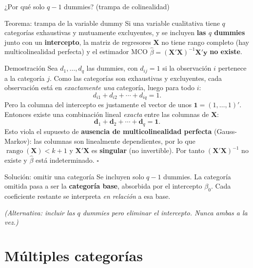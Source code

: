 \documentclass{beamer}
\begin{document}
\begin{frame}[allowframebreaks]{¿Por qué solo $q-1$ dummies? (trampa de colinealidad)}

\begin{alertblock}{Teorema: trampa de la variable dummy}
Si una variable cualitativa tiene $q$ categorías exhaustivas y mutuamente excluyentes, y se incluyen \textbf{las $q$ dummies} junto con un \textbf{intercepto}, la matriz de regresores $\mathbf{X}$ no tiene rango completo (hay multicolinealidad perfecta) y el estimador MCO $\hat{\beta}=(\mathbf{X}'\mathbf{X})^{-1}\mathbf{X}'\mathbf{y}$ \textbf{no existe}.
\end{alertblock}

\framebreak

\begin{exampleblock}{Demostración}
Sea $d_1,\dots,d_q$ las dummies, con $d_{ij}=1$ si la observación $i$ pertenece a la categoría $j$. Como las categorías son exhaustivas y excluyentes, cada observación está en \emph{exactamente una} categoría, luego para todo $i$:
\[
d_{i1} + d_{i2} + \cdots + d_{iq} = 1.
\]
\pause
Pero la columna del intercepto es justamente el vector de unos $\mathbf{1}=(1,\dots,1)'$. Entonces existe una combinación lineal \emph{exacta} entre las columnas de $\mathbf{X}$:
\[
\mathbf{d}_1 + \mathbf{d}_2 + \cdots + \mathbf{d}_q = \mathbf{1}.
\]
\pause
Esto viola el supuesto de \textbf{ausencia de multicolinealidad perfecta} (Gauss-Markov): las columnas son linealmente dependientes, por lo que $\operatorname{rango}(\mathbf{X})<k+1$ y $\mathbf{X}'\mathbf{X}$ es \textbf{singular} (no invertible). Por tanto $(\mathbf{X}'\mathbf{X})^{-1}$ no existe y $\hat{\beta}$ está indeterminado. \hfill$\square$
\end{exampleblock}

\framebreak

\begin{block}{Solución: omitir una categoría}
Se incluyen solo $q-1$ dummies. La categoría omitida pasa a ser la \textbf{categoría base}, absorbida por el intercepto $\beta_0$. Cada coeficiente restante se interpreta \emph{en relación} a esa base.

\medskip
\textit{(Alternativa: incluir las $q$ dummies pero eliminar el intercepto. Nunca ambas a la vez.)}
\end{block}

\end{frame}

\section{Múltiples categorías}
\end{document}
